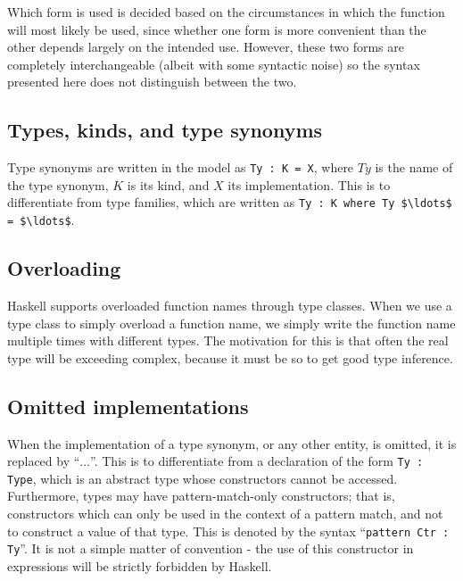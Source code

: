 Which form is used is decided based on the circumstances in which the function
will most likely be used, since whether one form is more convenient than the
other depends largely on the intended use. However, these two forms are
completely interchangeable (albeit with some syntactic noise) so the syntax
presented here does not distinguish between the two. 

\subsection*{Types, kinds, and type synonyms}

Type synonyms are written in the model as \lstinline!Ty : K = X!, where $Ty$ is 
the name
of the type synonym, $K$ is its kind, and $X$ its implementation. This is to 
differentiate
from type families, which are written as 
\lstinline!Ty : K where Ty $\ldots$ = $\ldots$!.

\subsection*{Overloading}

Haskell supports overloaded function names through type classes. When we use a 
type 
class to simply overload a function name, we simply write the function name
multiple times with different types. The motivation for this is that often the 
real type will be exceeding complex, because it must be so to get good type 
inference. 



\subsection*{Omitted implementations}

When the implementation of a type synonym, or any other entity, is omitted, it
is replaced by ``$\ldots$''. This is to differentiate from a declaration of the 
form
\lstinline!Ty : Type!, which is an abstract type whose constructors cannot be
accessed. Furthermore, types may have pattern-match-only constructors; that is,
constructors which can only be used in the context of a pattern match, and not
to construct a value of that type. This is denoted by the syntax
``\lstinline!pattern Ctr : Ty!''. It is not a simple matter of
convention - the use of this constructor in expressions will be strictly
forbidden by Haskell.


